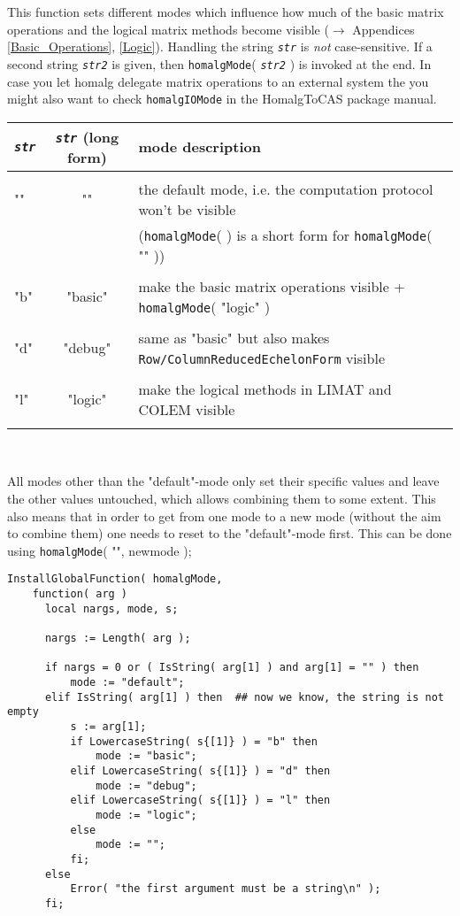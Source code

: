 \documentclass[a4paper,11pt]{report}
\begin{document}
{{{ This function sets different modes which influence how much of the basic
matrix operations and the logical matrix methods become visible ($\to$ Appendices \ref{Basic_Operations}, \ref{Logic}). Handling the string \mbox{\texttt{\slshape str}} is \emph{not} case-sensitive. If a second string \mbox{\texttt{\slshape str2}} is given, then \texttt{homalgMode}( \mbox{\texttt{\slshape str2}} ) is invoked at the end. In case you let \textsf{homalg} delegate matrix operations to an external system the you might also want to
check \texttt{homalgIOMode} in the \textsf{HomalgToCAS} package manual. \begin{center}
\begin{tabular}{l|c|l}\mbox{\texttt{\slshape str}}&
\mbox{\texttt{\slshape str}} (long form)&
mode description\\
\hline
&
&
\\
""&
""&
the default mode, i.e. the computation protocol won't be visible\\
&
&
(\texttt{homalgMode}( ) is a short form for \texttt{homalgMode}( "" ))\\
&
&
\\
"b"&
"basic"&
make the basic matrix operations visible + \texttt{homalgMode}( "logic" )\\
&
&
\\
"d"&
"debug"&
same as "basic" but also makes \texttt{Row/ColumnReducedEchelonForm} visible\\
&
&
\\
"l"&
"logic"&
make the logical methods in \textsf{LIMAT} and \textsf{COLEM} visible\\
&
&
\\
\hline
\end{tabular}\\[2mm]
\end{center}

 All modes other than the "default"-mode only set their specific values and
leave the other values untouched, which allows combining them to some extent.
This also means that in order to get from one mode to a new mode (without the
aim to combine them) one needs to reset to the "default"-mode first. This can
be done using \texttt{homalgMode}( "", new{\textunderscore}mode ); 
\begin{Verbatim}[fontsize=\small,frame=single,label=Code]
  InstallGlobalFunction( homalgMode,
    function( arg )
      local nargs, mode, s;
      
      nargs := Length( arg );
      
      if nargs = 0 or ( IsString( arg[1] ) and arg[1] = "" ) then
          mode := "default";
      elif IsString( arg[1] ) then	## now we know, the string is not empty
          s := arg[1];
          if LowercaseString( s{[1]} ) = "b" then
              mode := "basic";
          elif LowercaseString( s{[1]} ) = "d" then
              mode := "debug";
          elif LowercaseString( s{[1]} ) = "l" then
              mode := "logic";
          else
              mode := "";
          fi;
      else
          Error( "the first argument must be a string\n" );
      fi;
      

\end{Verbatim}}}}
\end{document}
